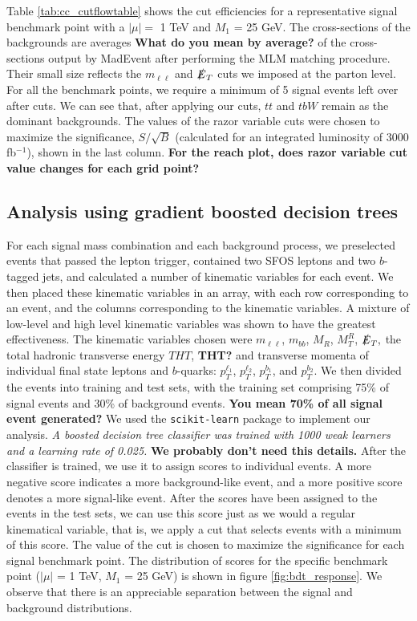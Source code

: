 \documentclass[a4paper,11pt]{article}
\newcommand{\Shufang}[1]{{\bf\color{Maroon}  #1}}
\begin{document}
Table \ref{tab:cc_cutflowtable} shows the cut efficiencies for a representative
signal benchmark point with a $|\mu| =$ 1 TeV and $M_1$ = 25 GeV.   The
cross-sections of the backgrounds are averages \Shufang{What do you mean by average?}  of the cross-sections output by
MadEvent after performing the MLM matching procedure. Their small size reflects
the $m_{\ell\ell}$ and $\slashed{E}_T$ cuts we imposed at the parton level. For all
the benchmark points, we require a minimum of 5 signal events left over after
cuts. We can see that, after applying our cuts, $tt$ and $tbW$ remain as the
dominant backgrounds. The values of the razor variable cuts were chosen to
maximize the significance, $S/\sqrt{B}$ (calculated for an integrated luminosity
of 3000 fb$^{-1}$), shown in the last column.  \Shufang{For the reach plot, does razor variable cut value changes for each grid point?}

\subsection{Analysis using gradient boosted decision trees}\label{subsec:bdt}

For each signal mass combination and each background process, we preselected
events that passed the lepton trigger, contained two SFOS leptons and two
$b$-tagged jets, and calculated a number of kinematic variables for each event. We then
placed these kinematic variables in an array, with each row corresponding to an event, and
the columns corresponding to the kinematic variables. A mixture of low-level and high level
kinematic variables was shown to have the greatest effectiveness. The kinematic variables chosen were
$m_{\ell\ell}$, $m_{bb}$, $M_R$, $M_T^R$, $\slashed{E}_T,$ the total hadronic
transverse energy $THT$, \Shufang{THT?} and transverse momenta of individual final state
leptons and $b$-quarks: $p_T^{\ell_1}$, $p_T^{\ell_2}$, $p_T^{b_1}$, and $p_T^{b_2}$. We
then divided the events into training and test sets, with the training set
comprising 75\% of signal events and 30\% of background events. \Shufang{You mean 70\% of all signal event generated? } We used the
\texttt{scikit-learn} package  \citep{Pedregosa2011} to implement our analysis.
{\it A boosted decision tree classifier was trained with 1000 weak learners and a
learning rate of 0.025. } \Shufang{We probably don't need this details.}  After the classifier is trained, we use it to assign
scores to individual events. A more negative score indicates a more
background-like event, and a more positive score denotes a more signal-like
event. After the scores have been assigned to the events in the test sets, we
can use this score just as we would a regular kinematical variable, that is, we
apply a cut that selects events with a minimum of this score. The value of the
cut is chosen to maximize the significance for each signal benchmark point. The
distribution of scores for the specific benchmark point ($|\mu|$ = 1 TeV, $M_1$
= 25 GeV) is shown in figure \ref{fig:bdt_response}. We observe that there is an
appreciable separation between the signal and background distributions.
\end{document}

